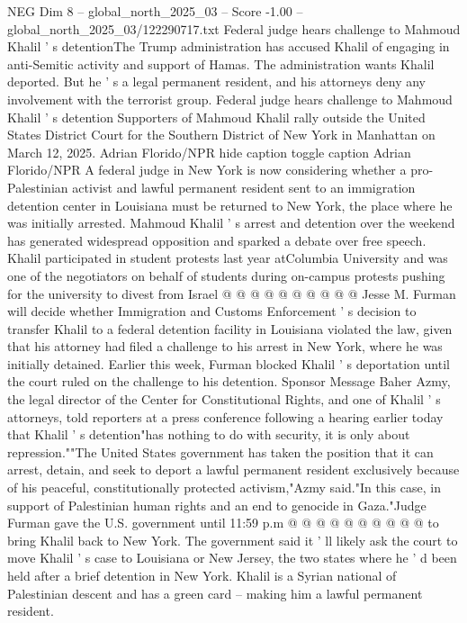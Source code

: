 \begin{textsample}{NEG Dim 8 – global\_north\_2025\_03 – Score -1.00 – global\_north\_2025\_03/122290717.txt}  \label{ex:f8_neg_362}
Federal judge hears challenge to Mahmoud Khalil ' s detentionThe Trump administration has accused Khalil of engaging in anti-Semitic activity and support of Hamas.
The administration wants Khalil deported.
But he ' s a legal permanent resident, and his attorneys deny any involvement with the terrorist group.
Federal judge hears challenge to Mahmoud Khalil ' s detention Supporters of Mahmoud Khalil rally outside the United States District Court for the Southern District of New York in Manhattan on March 12, 2025.
Adrian Florido/NPR hide caption toggle caption Adrian Florido/NPR A federal judge in New York is now considering whether a pro-Palestinian activist and lawful permanent resident sent to an immigration detention center in Louisiana must be returned to New York, the place where he was initially arrested.
Mahmoud Khalil ' s arrest and detention over the weekend has generated widespread opposition and sparked a debate over free speech.
Khalil participated in student protests last year atColumbia University and was one of the negotiators on behalf of students during on-campus protests pushing for the university to divest from Israel @ @ @ @ @ @ @ @ @ @ Jesse M.
Furman will decide whether Immigration and Customs Enforcement ' s decision to transfer Khalil to a federal detention facility in Louisiana violated the law, given that his attorney had filed a challenge to his arrest in New York, where he was initially detained.
Earlier this week, Furman blocked Khalil ' s deportation until the court ruled on the challenge to his detention.
Sponsor Message Baher Azmy, the legal director of the Center for Constitutional Rights, and one of Khalil ' s attorneys, told reporters at a press conference following a hearing earlier today that Khalil ' s detention"has nothing to do with security, it is only about repression.""The United States government has taken the position that it can arrest, detain, and seek to deport a lawful permanent resident exclusively because of his peaceful, constitutionally protected activism,"Azmy said."In this case, in support of Palestinian human rights and an end to genocide in Gaza."Judge Furman gave the U.S. government until 11:59 p.m @ @ @ @ @ @ @ @ @ @ to bring Khalil back to New York.
The government said it ' ll likely ask the court to move Khalil ' s case to Louisiana or New Jersey, the two states where he ' d been held after a brief detention in New York.
Khalil is a Syrian national of Palestinian descent and has a green card -- making him a lawful permanent resident.

\end{textsample}
